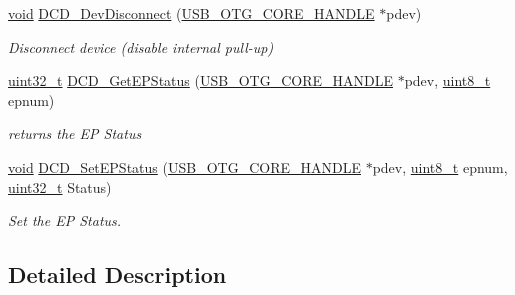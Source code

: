 \begin{DoxyCompactItemize}
\hyperlink{group___n_a_m_e_ga18028b8badbf1ea7e704ccac3c488e82}{void} \hyperlink{group___u_s_b___d_c_d___private___functions_gabceac3831bd896522e96c5885ac9ac3b}{D\-C\-D\-\_\-\-Dev\-Disconnect} (\hyperlink{group___u_s_b___c_o_r_e___exported___types_gaf76054c11eb8a3367907aad7ae700e80}{U\-S\-B\-\_\-\-O\-T\-G\-\_\-\-C\-O\-R\-E\-\_\-\-H\-A\-N\-D\-L\-E} $\ast$pdev)
\begin{DoxyCompactList}\small\item\em Disconnect device (disable internal pull-\/up) \end{DoxyCompactList}\item 
\hyperlink{stdint_8h_a435d1572bf3f880d55459d9805097f62}{uint32\-\_\-t} \hyperlink{group___u_s_b___d_c_d___private___functions_ga4c90c3ca8ad2f5dda0de937ddc2c115c}{D\-C\-D\-\_\-\-Get\-E\-P\-Status} (\hyperlink{group___u_s_b___c_o_r_e___exported___types_gaf76054c11eb8a3367907aad7ae700e80}{U\-S\-B\-\_\-\-O\-T\-G\-\_\-\-C\-O\-R\-E\-\_\-\-H\-A\-N\-D\-L\-E} $\ast$pdev, \hyperlink{stdint_8h_aba7bc1797add20fe3efdf37ced1182c5}{uint8\-\_\-t} epnum)
\begin{DoxyCompactList}\small\item\em returns the E\-P Status \end{DoxyCompactList}\item 
\hyperlink{group___n_a_m_e_ga18028b8badbf1ea7e704ccac3c488e82}{void} \hyperlink{group___u_s_b___d_c_d___private___functions_ga38147684b1cc15f071ef305a8f50320b}{D\-C\-D\-\_\-\-Set\-E\-P\-Status} (\hyperlink{group___u_s_b___c_o_r_e___exported___types_gaf76054c11eb8a3367907aad7ae700e80}{U\-S\-B\-\_\-\-O\-T\-G\-\_\-\-C\-O\-R\-E\-\_\-\-H\-A\-N\-D\-L\-E} $\ast$pdev, \hyperlink{stdint_8h_aba7bc1797add20fe3efdf37ced1182c5}{uint8\-\_\-t} epnum, \hyperlink{stdint_8h_a435d1572bf3f880d55459d9805097f62}{uint32\-\_\-t} Status)
\begin{DoxyCompactList}\small\item\em Set the E\-P Status. \end{DoxyCompactList}\end{DoxyCompactItemize}


\subsection{Detailed Description}


